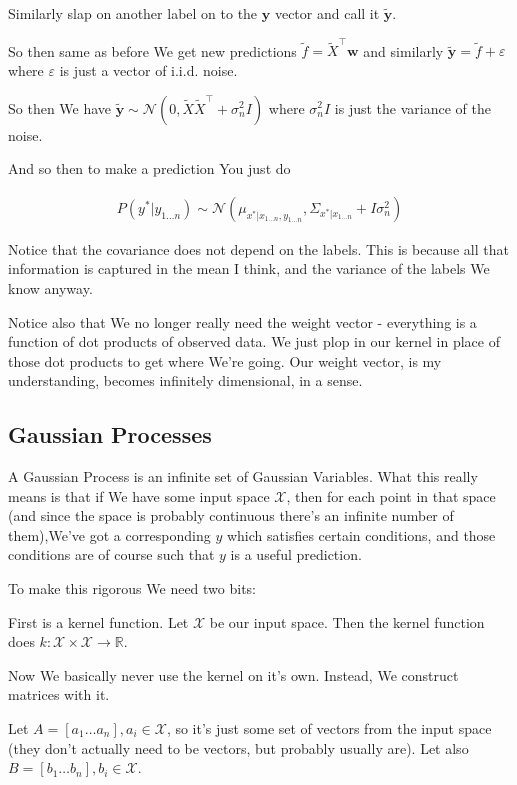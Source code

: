 \documentclass{article}
\begin{document}
		Similarly slap on another label on to the $\mathbf{y}$ vector and call it $\tilde{\mathbf{y}}$.
		
		So then same as before We get new predictions $\tilde{f} = \tilde{X}^\top\mathbf{w}$ and similarly $\tilde{\mathbf{y}} = \tilde{f} + \varepsilon$ where $\varepsilon$ is just a vector of i.i.d. noise.
		
		So then We have $\tilde{\mathbf{y}}\sim\mathcal{N}(0, \tilde{X}\tilde{X}^\top + \sigma^2_n I)$ where $\sigma^2_n I$ is just the variance of the noise.
		
		And so then to make a prediction You just do
		
		\begin{align}
			P(y^*|y_{1\ldots n}) \sim \mathcal{N}(\mu_{x^*|x_{1\ldots n}, y_{1\ldots n}}, \Sigma_{x^*|x_{1\ldots n}} + I\sigma^2_n)
		\end{align}
		
		Notice that the covariance does not depend on the labels. This is because all that information is captured in the mean I think, and the variance of the labels We know anyway.
		
		Notice also that We no longer really need the weight vector - everything is a function of dot products of observed data. We just plop in our kernel in place of those dot products to get where We're going. Our weight vector, is my understanding, becomes infinitely dimensional, in a sense.
		
	\subsection{Gaussian Processes}
	
		A Gaussian Process is an infinite set of Gaussian Variables. What this really means is that if We have some input space $\mathcal{X}$, then for each point in that space (and since the space is probably continuous there's an infinite number of them),We've got a corresponding $y$ which satisfies certain conditions, and those conditions are of course such that $y$ is a useful prediction.
		
		To make this rigorous We need two bits:
		
		First is a kernel function. Let $\mathcal{X}$ be our input space. Then the kernel function does $k: \mathcal{X}\times\mathcal{X}\to\mathbb{R}$.
		
		Now We basically never use the kernel on it's own. Instead, We construct matrices with it.
		
		Let $A = [a_1\ldots a_n], a_i\in\mathcal{X}$, so it's just some set of vectors from the input space (they don't actually need to be vectors, but probably usually are). Let also $B = [b_1\ldots b_n], b_i\in\mathcal{X}$.
		
\end{document}
